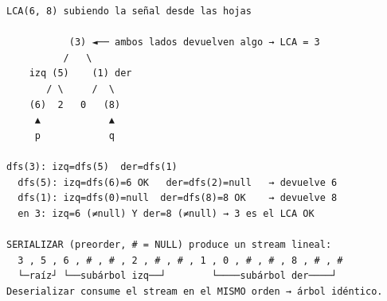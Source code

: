 \begin{dsacomofunciona}
\begin{verbatim}
LCA(6, 8) subiendo la señal desde las hojas

           (3) ◄── ambos lados devuelven algo → LCA = 3
          /   \
    izq (5)    (1) der
       / \     /  \
    (6)  2   0   (8)
     ▲            ▲
     p            q

dfs(3): izq=dfs(5)  der=dfs(1)
  dfs(5): izq=dfs(6)=6 OK   der=dfs(2)=null   → devuelve 6
  dfs(1): izq=dfs(0)=null  der=dfs(8)=8 OK    → devuelve 8
  en 3: izq=6 (≠null) Y der=8 (≠null) → 3 es el LCA OK

SERIALIZAR (preorder, # = NULL) produce un stream lineal:
  3 , 5 , 6 , # , # , 2 , # , # , 1 , 0 , # , # , 8 , # , #
  └─raíz┘ └──subárbol izq──┘        └────subárbol der────┘
Deserializar consume el stream en el MISMO orden → árbol idéntico.
\end{verbatim}
\end{dsacomofunciona}

